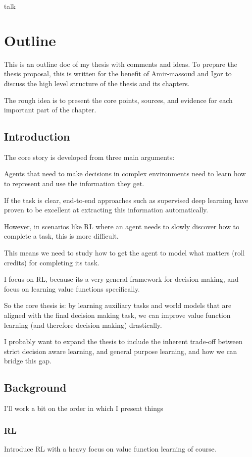talk\chapter*{Outline}

This is an outline doc of my thesis with comments and ideas.
To prepare the thesis proposal, this is written for the benefit of Amir-massoud and Igor to discuss the high level structure of the thesis and its chapters.

The rough idea is to present the core points, sources, and evidence for each important part of the chapter.

\section{Introduction}

The core story is developed from three main arguments:

Agents that need to make decisions in complex environments need to learn how to represent and use the information they get.

If the task is clear, end-to-end approaches such as supervised deep learning have proven to be excellent at extracting this information automatically.

However, in scenarios like RL where an agent needs to slowly discover how to complete a task, this is more difficult.

This means we need to study how to get the agent to model what matters (roll credits) for completing its task.

I focus on RL, because its a very general framework for decision making, and focus on learning value functions specifically.

So the core thesis is: by learning auxiliary tasks and world models that are aligned with the final decision making task, we can improve value function learning (and therefore decision making) drastically.

I probably want to expand the thesis to include the inherent trade-off between strict decision aware learning, and general purpose learning, and how we can bridge this gap.

\section{Background}

I'll work a bit on the order in which I present things

\subsection{RL}
Introduce RL with a heavy focus on value function learning of course.

